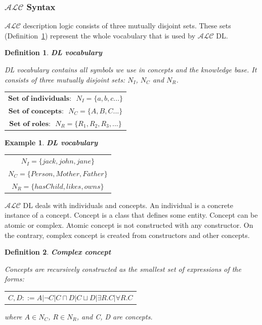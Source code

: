 \documentclass[12pt,a4paper]{article}
\newtheorem{definition}{Definition}[subsection]
\newtheorem{example}{Example}[subsection]
\begin{document}
\subsubsection{$\mathcal{ALC}$ Syntax}
$\mathcal{ALC}$ description logic consists of three mutually disjoint sets. These sets (Definition~\ref{def:DLVocabulary}) represent the whole vocabulary that is used by $\mathcal{ALC}$ DL.

\begin{definition}{\textbf{DL vocabulary}}
	\label{def:DLVocabulary}
	
	DL vocabulary contains all symbols we use in concepts and the knowledge base. It consists of three mutually disjoint sets: $N_{I}$, $N_{C}$ and $N_{R}$. 
	
	\begin{table}[H]
		\centering
		\begin{tabular}{c}
			$ \textbf{Set of individuals:} \text{ } N_{I} = \{a,b,c...\} $ \\
			\addlinespace[0.4cm]
			$ \textbf{Set of concepts:} \text{ } N_{C} = \{A,B,C...\} $ \\
			\addlinespace[0.4cm]
			$ \textbf{Set of roles:} \text{ } N_{R} = \{R_{1},R_{2},R_{3},...\} $			
		\end{tabular}
	\end{table}		
		
\end{definition}

\begin{example}{\textbf{DL vocabulary}}
	
	\begin{table}[H]
		\centering
		\begin{tabular}{c}
			$ N_{I} = \{ jack, john, jane \} $ \\
			\addlinespace[0.4cm]
			$ N_{C} = \{ Person, Mother, Father \} $ \\
			\addlinespace[0.4cm]
			$ N_{R} = \{ hasChild, likes, owns \} $
		\end{tabular}
	\end{table}
\end{example}

$\mathcal{ALC}$ DL deals with individuals and concepts. An individual is a concrete instance of a concept. Concept is a class that defines some entity. Concept can be atomic or complex. Atomic concept is not constructed with any constructor. On the contrary, complex concept is created from constructors and other concepts.

\begin{definition}{\textbf{Complex concept}}
	\label{def:complexConcept}
	
	Concepts are recursively constructed as the smallest set of expressions of the forms:

	\begin{table}[H]
		\centering
		\begin{tabular}{c}
			$ C,D ::= A | \neg C | C \sqcap D | C \sqcup D | \exists R.C | \forall R.C $
		\end{tabular}
	\end{table}

	where $A \in N_{C}$, $R \in N_{R}$, and C, D are concepts.
\end{definition}
\end{document}
